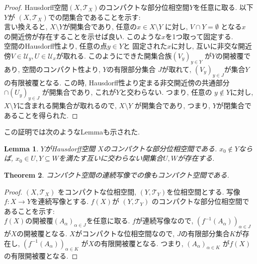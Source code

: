 \documentclass[dvipdfmx]{jbook}
\newtheorem{theorem}{Theorem}[section]
\newtheorem{lemma}[theorem]{Lemma}
\theoremstyle{remark}
\theoremstyle{plain}
\begin{document}
\begin{proof}
	Hausdorff空間$\left( X , \mathcal{T}_{X} \right)$のコンパクトな部分位相空間$Y$を任意に取る.
	以下$Y$が $\left(  X, \mathcal{T}_{X} \right)$での閉集合であることを示す:\\
	言い換えると, $X\setminus Y$が開集合であり, 任意の$x \in X \setminus Y$ に対し,
	$V \cap Y = \emptyset$ となる$x$ の開近傍が存在することを示せば良い. このような$x$を1つ取って固定する.\\
	空間のHausdorff性より, 任意の点$y \in Y$と 固定された$x$に対し, 互いに非交な開近傍$V \in \mathcal{U}_y,U \in \mathcal{U}_x$が取れる. 
	このようにできた開集合族$\left( V_y \right) _{y \in Y}$ が$Y$の開被覆であり,
	空間のコンパクト性より,  $Y$の有限部分集合 $J$が取れて, 
	$\left( V_y \right) _{y \in J}$が集合$Y$の有限被覆となる. 
	この時, Hausdorff性より定まる非交開近傍の共通部分 $\cap \left( U_y \right) _{y \in J}$ が開集合であり, 
	これが$Y$と交わらない.
	つまり, 任意の $y \not\in Y$に対し,
	$X \setminus Y$に含まれる開集合が取れるので, 
	$X \setminus Y$ が開集合であり, 
	つまり, $Y$が閉集合であることを得られた.
\end{proof}

この証明では次のようなLemmaも示された.
\begin{lemma}
	\label{lem:compact-separate}
	$Y$がHausdorff空間 $X$のコンパクトな部分位相空間である.  $x_0 \not\in Y$ならば, $x_0 \in U, Y \subseteq W$を満たす互いに交わらない開集合$U,W$が存在する.
\end{lemma}

\begin{theorem}
	コンパクト空間の連続写像での像もコンパクト空間である.
\end{theorem}

\begin{proof}
	$\left( X , \mathcal{T}_{X} \right)$ をコンパクトな位相空間, $\left( Y , \mathcal{T}_{Y} \right)$を位相空間とする. 
	写像$f: X \to Y$を連続写像とする. $f(X)$が $\left( Y , \mathcal{T}_{Y} \right)$ のコンパクトな部分位相空間であることを示す:\\
	$f(X)$の開被覆$\left( A_{\alpha} \right)_{\alpha \in J}$を任意に取る.
	$f$が連続写像なので, $\left( f^{-1}(A_{\alpha}) \right) _{\alpha \in J}$ が$X$の開被覆となる.
	$X$がコンパクトな位相空間なので,  $J$の有限部分集合$K$が存在し,  $\left( f^{-1}(A_{\alpha}) \right)_{\alpha \in K} $ が$X$の有限開被覆となる. つまり, $\left( A_{\alpha} \right) _{\alpha \in K}$ が$f(X)$の有限開被覆となる.

\end{proof}
\end{document}
